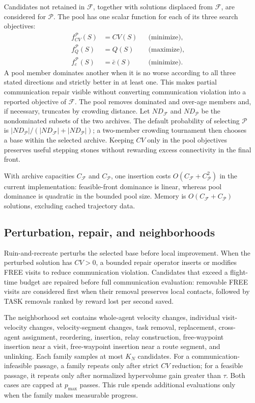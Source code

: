 Candidates not retained in $\mathcal F$, together with solutions displaced from $\mathcal F$, are considered for $\mathcal P$. The pool has one scalar function for each of its three search objectives:
\begin{align}
 f_{CV}^{\mathcal P}(S)&=CV(S) &&\text{(minimize)},\nonumber\\
 f_Q^{\mathcal P}(S)&=Q(S) &&\text{(maximize)},\nonumber\\
 f_c^{\mathcal P}(S)&=\bar c(S) &&\text{(minimize)}.
 \label{eq:pool_objectives}
\end{align}
A pool member dominates another when it is no worse according to all three stated directions and strictly better in at least one. This makes partial communication repair visible without converting communication violation into a reported objective of $\mathcal F$. The pool removes dominated and over-age members and, if necessary, truncates by crowding distance. Let $ND_{\mathcal F}$ and $ND_{\mathcal P}$ be the nondominated subsets of the two archives. The default probability of selecting $\mathcal P$ is $|ND_{\mathcal P}|/(|ND_{\mathcal F}|+|ND_{\mathcal P}|)$; a two-member crowding tournament then chooses a base within the selected archive. Keeping $CV$ only in the pool objectives preserves useful stepping stones without rewarding excess connectivity in the final front.

With archive capacities $C_{\mathcal F}$ and $C_{\mathcal P}$, one insertion costs $O(C_{\mathcal F}+C_{\mathcal P}^2)$ in the current implementation: feasible-front dominance is linear, whereas pool dominance is quadratic in the bounded pool size. Memory is $O(C_{\mathcal F}+C_{\mathcal P})$ solutions, excluding cached trajectory data.

\subsection{Perturbation, repair, and neighborhoods}
Ruin-and-recreate perturbs the selected base before local improvement. When the perturbed solution has $CV>0$, a bounded repair operator inserts or modifies FREE visits to reduce communication violation. Candidates that exceed a flight-time budget are repaired before full communication evaluation: removable FREE visits are considered first when their removal preserves local contacts, followed by TASK removals ranked by reward lost per second saved.

The neighborhood set contains whole-agent velocity changes, individual visit-velocity changes, velocity-segment changes, task removal, replacement, cross-agent assignment, reordering, insertion, relay construction, free-waypoint insertion near a visit, free-waypoint insertion near a route segment, and unlinking. Each family samples at most $K_N$ candidates. For a communication-infeasible passage, a family repeats only after strict $CV$ reduction; for a feasible passage, it repeats only after normalized hypervolume gain greater than $\tau$. Both cases are capped at $p_{\max}$ passes. This rule spends additional evaluations only when the family makes measurable progress.


